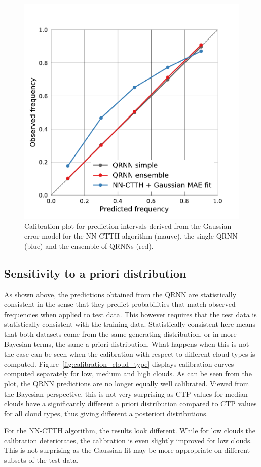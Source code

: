 \documentclass[journal abbreviation, manuscript]{copernicus}
\begin{document}
  \begin{figure}[hbpt!]
    \centering
    \includegraphics[width = 0.5\linewidth]{../plots/calibration_1}
    \caption{Calibration plot for prediction intervals derived from the Gaussian
      error model for the NN-CTTH algorithm (mauve), the single QRNN (blue) and
      the ensemble of QRNNs (red).}
    \label{fig:calibration}
  \end{figure}

\subsection{Sensitivity to a priori distribution}

As shown above, the predictions obtained from the QRNN are statistically
consistent in the sense that they predict probabilities that match observed
frequencies when applied to test data. This however requires that the test data
is statistically consistent with the training data. Statistically consistent
here means that both datasets come from the same generating distribution, or in
more Bayesian terms, the same a priori distribution. What happens when this is
not the case can be seen when the calibration with respect to different cloud
types is computed. Figure~\ref{fig:calibration_cloud_type} displays calibration
curves computed separately for low, medium and high clouds. As can be seen from the plot, the QRNN
predictions are no longer equally well calibrated. Viewed from the Bayesian
perspective, this is not very surprising as CTP values for median clouds have a
significantly different a priori distribution compared to CTP values for all
cloud types, thus giving different a posteriori distributions.

 For the NN-CTTH algorithm, the results look different. While for low clouds
the calibration deteriorates, the calibration is even slightly improved for
low clouds. This is not surprising as the Gaussian fit may be more
appropriate on different subsets of the test data. 
\end{document}
